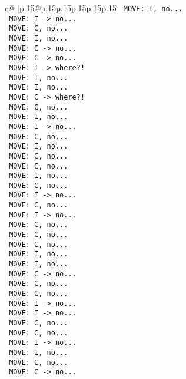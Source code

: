 \documentclass{article}
\begin{document}
{\begin{supertabular}{c@{$\;$}|p{.15\linewidth}@{}p{.15\linewidth}p{.15\linewidth}p{.15\linewidth}p{.15\linewidth}p{.15\linewidth}}
{{{\texttt{ MOVE: I, no...} \\
\texttt{ MOVE: I {-}> no...} \\
\texttt{ MOVE: C, no...} \\
\texttt{ MOVE: I, no...} \\
\texttt{ MOVE: C {-}> no...} \\
\texttt{ MOVE: C {-}> no...} \\
\texttt{ MOVE: I {-}> where?!} \\
\texttt{ MOVE: I, no...} \\
\texttt{ MOVE: I, no...} \\
\texttt{ MOVE: C {-}> where?!} \\
\texttt{ MOVE: C, no...} \\
\texttt{ MOVE: I, no...} \\
\texttt{ MOVE: I {-}> no...} \\
\texttt{ MOVE: C, no...} \\
\texttt{ MOVE: I, no...} \\
\texttt{ MOVE: C, no...} \\
\texttt{ MOVE: C, no...} \\
\texttt{ MOVE: I, no...} \\
\texttt{ MOVE: C, no...} \\
\texttt{ MOVE: I {-}> no...} \\
\texttt{ MOVE: C, no...} \\
\texttt{ MOVE: I {-}> no...} \\
\texttt{ MOVE: C, no...} \\
\texttt{ MOVE: C, no...} \\
\texttt{ MOVE: C, no...} \\
\texttt{ MOVE: I, no...} \\
\texttt{ MOVE: I, no...} \\
\texttt{ MOVE: C {-}> no...} \\
\texttt{ MOVE: C, no...} \\
\texttt{ MOVE: C, no...} \\
\texttt{ MOVE: I {-}> no...} \\
\texttt{ MOVE: I {-}> no...} \\
\texttt{ MOVE: C, no...} \\
\texttt{ MOVE: C, no...} \\
\texttt{ MOVE: I {-}> no...} \\
\texttt{ MOVE: I, no...} \\
\texttt{ MOVE: C, no...} \\
\texttt{ MOVE: C {-}> no...} \\
}}}
\end{supertabular}}
\end{document}
